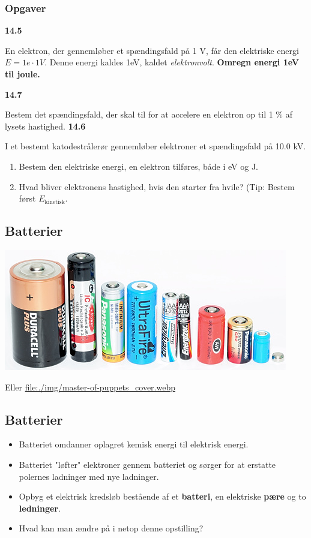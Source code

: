 \documentclass[11pt]{article}
\begin{document}
\subsubsection*{Opgaver}
\label{sec:org998825e}
\textbf{14.5}

En elektron, der gennemløber et spændingsfald på 1 V, får den elektriske energi \(E= 1 e \cdot 1 V\). Denne energi kaldes 1eV, kaldet \emph{elektronvolt}. \textbf{Omregn energi 1eV til joule.}

\textbf{14.7}

Bestem det spændingsfald, der skal til for at accelere en elektron op til 1 \% af lysets hastighed.
\textbf{14.6}

I et bestemt katodestrålerør gennemløber elektroner et spændingsfald på 10.0 kV.

\begin{enumerate}
\item Bestem den elektriske energi, en elektron tilføres, både i eV og J.
\item Hvad bliver elektronens hastighed, hvis den starter fra hvile? (Tip: Bestem først \(E_\text{kinetisk}\).
\end{enumerate}

\subsection*{Batterier}
\label{sec:org81be910}
\begin{center}
\includegraphics[width=.9\linewidth]{./img/batterier.jpg}
\end{center}

Eller
\href{https://youtu.be/\_yHJBDeshPA}{file:./img/master-of-puppets\_cover.webp}

\subsection*{Batterier}
\label{sec:orgc873675}
\begin{itemize}
\item Batteriet omdanner oplagret kemisk energi til elektrisk energi.
\item Batteriet "løfter" elektroner gennem batteriet og sørger for at erstatte polernes ladninger med nye ladninger.
\item Opbyg et elektrisk kredsløb bestående af et \textbf{batteri}, en elektriske \textbf{pære} og to \textbf{ledninger}.
\item Hvad kan man ændre på i netop denne opstilling?
\end{itemize}
\end{document}
